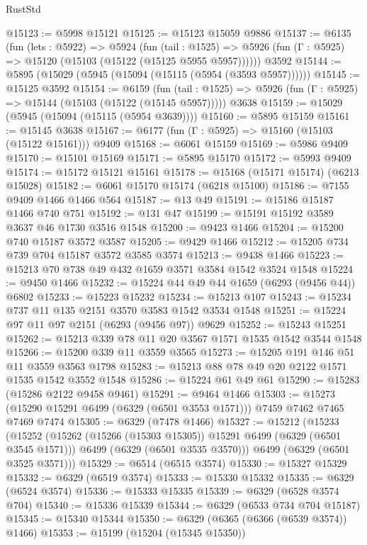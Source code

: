 \begin{lexlean}{RustStd}
\begin{coremodule}
{{@15123 := @5998 @15121
@15125 := @15123 @15059 @9886
@15137 := @6135
    (fun (lets : @5922) =>
    @5924
      (fun (tail : @1525) =>
      @5926 (fun (Γ : @5925) => @15120 (@15103 (@15122 (@15125 @5955 @5957))))))
    @3592
@15144 := @5895 (@15029 (@5945 (@15094 (@15115 (@5954 (@3593 @5957))))))
@15145 := @15125 @3592
@15154 := @6159
    (fun (tail : @1525) => @5926 (fun (Γ : @5925) => @15144 (@15103 (@15122 (@15145 @5957)))))
    @3638
@15159 := @15029 (@5945 (@15094 (@15115 (@5954 @3639))))
@15160 := @5895 @15159
@15161 := @15145 @3638
@15167 := @6177 (fun (Γ : @5925) => @15160 (@15103 (@15122 @15161))) @9409
@15168 := @6061 @15159
@15169 := @5986 @9409
@15170 := @15101 @15169
@15171 := @5895 @15170
@15172 := @5993 @9409
@15174 := @15172 @15121 @15161
@15178 := @15168 (@15171 @15174) (@6213 @15028)
@15182 := @6061 @15170 @15174 (@6218 @15100)
@15186 := @7155 @9409 @1466 @1466 @564
@15187 := @13 @49
@15191 := @15186 @15187 @1466 @740 @751
@15192 := @131 @47
@15199 := @15191 @15192 @3589 @3637 @46 @1730 @3516 @1548
@15200 := @9423 @1466
@15204 := @15200 @740 @15187 @3572 @3587
@15205 := @9429 @1466
@15212 := @15205 @734 @739 @704 @15187 @3572 @3585 @3574
@15213 := @9438 @1466
@15223 := @15213 @70 @738 @49 @432 @1659 @3571 @3584 @1542 @3524 @1548
@15224 := @9450 @1466
@15232 := @15224 @44 @49 @44 @1659 (@6293 (@9456 @44)) @6802
@15233 := @15223 @15232
@15234 := @15213 @107
@15243 := @15234 @737 @11 @135 @2151 @3570 @3583 @1542 @3534 @1548
@15251 := @15224 @97 @11 @97 @2151 (@6293 (@9456 @97)) @9629
@15252 := @15243 @15251
@15262 := @15213 @339 @78 @11 @20 @3567 @1571 @1535 @1542 @3544 @1548
@15266 := @15200 @339 @11 @3559 @3565
@15273 := @15205 @191 @146 @51 @11 @3559 @3563 @1798
@15283 := @15213 @88 @78 @49 @20 @2122 @1571 @1535 @1542 @3552 @1548
@15286 := @15224 @61 @49 @61
@15290 := @15283 (@15286 @2122 @9458 @9461)
@15291 := @9464 @1466
@15303 := @15273 (@15290 @15291 @6499 (@6329 (@6501 @3553 @1571))) @7459 @7462 @7465 @7469 @7474
@15305 := @6329 (@7478 @1466)
@15327 := @15212
    (@15233
      (@15252
        (@15262 (@15266 (@15303 @15305)) @15291 @6499 (@6329 (@6501 @3545 @1571)))
        @6499
        (@6329 (@6501 @3535 @3570)))
      @6499
      (@6329 (@6501 @3525 @3571)))
@15329 := @6514 (@6515 @3574)
@15330 := @15327 @15329
@15332 := @6329 (@6519 @3574)
@15333 := @15330 @15332
@15335 := @6329 (@6524 @3574)
@15336 := @15333 @15335
@15339 := @6329 (@6528 @3574 @704)
@15340 := @15336 @15339
@15344 := @6329 (@6533 @734 @704 @15187)
@15345 := @15340 @15344
@15350 := @6329 (@6365 (@6366 (@6539 @3574)) @1466)
@15353 := @15199 (@15204 (@15345 @15350))
}}
\end{coremodule}
\end{lexlean}
